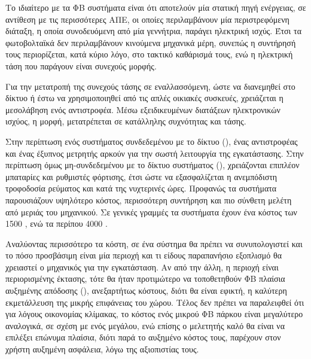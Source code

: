 \documentclass[12pt]{report}
\begin{document}
Το ιδιαίτερο με τα ΦΒ συστήματα είναι ότι αποτελούν μία στατική πηγή ενέργειας, σε αντίθεση με τις περισσότερες ΑΠΕ, οι οποίες περιλαμβάνουν μία περιστρεφόμενη διάταξη, η οποία συνοδευόμενη από μία γεννήτρια, παράγει ηλεκτρική
ισχύς. Έτσι τα φωτοβολταϊκά δεν περιλαμβάνουν κινούμενα μηχανικά μέρη, συνεπώς η συντήρησή τους περιορίζεται, κατά κύριο λόγο, στο τακτικό καθάρισμά τους, ενώ η ηλεκτρική τάση που παράγουν είναι συνεχούς μορφής.

Για την μετατροπή της συνεχούς τάσης σε εναλλασσόμενη, ώστε να διανεμηθεί στο δίκτυο ή έστω να χρησιμοποιηθεί από τις απλές οικιακές συσκευές, χρειάζεται η μεσολάβηση ενός αντιστροφέα. Μέσω εξειδικευμένων διατάξεων ηλεκτρονικών
ισχύος, η {} μορφή, μετατρέπεται σε {} κατάλληλης συχνότητας και τάσης. 

Στην περίπτωση ενός συστήματος συνδεδεμένου με το δίκτυο ({}), ένας αντιστροφέας και ένας έξυπνος μετρητής αρκούν για την σωστή λειτουργία της εγκατάστασης. Στην περίπτωση όμως μη-συνδεδεμένου με το δίκτυο
συστήματος ({}), χρειάζονται επιπλέον μπαταρίες και ρυθμιστές φόρτισης, έτσι ώστε να εξασφαλίζεται η ανεμπόδιστη τροφοδοσία ρεύματος και κατά της νυχτερινές ώρες. Προφανώς τα {}
συστήματα παρουσιάζουν υψηλότερο κόστος, περισσότερη συντήρηση και πιο σύνθετη μελέτη από μεριάς του μηχανικού. Σε γενικές γραμμές τα {} συστήματα έχουν ένα κόστος των 1500 {}, ενώ τα 
{} περίπου 4000 {}.

Αναλύοντας περισσότερο τα κόστη, σε ένα σύστημα θα πρέπει να συνυπολογιστεί και το πόσο προσβάσιμη είναι μία περιοχή και τι είδους παραπανήσιο εξοπλισμό θα χρειαστεί ο μηχανικός για την εγκατάσταση. 
Αν από την άλλη, η περιοχή είναι περιορισμένης έκτασης, τότε θα ήταν προτιμώτερο να τοποθετηθούν ΦΒ πλαίσια αυξημένης απόδοσης ({}), ανεξαρτήτως κόστους, διότι θα είναι εφικτή, η καλύτερη εκμετάλλευση 
της μικρής επιφάνειας του χώρου. Τέλος δεν
πρέπει να παραλειφθεί ότι για λόγους οικονομίας κλίμακας, το κόστος ενός μικρού ΦΒ πάρκου είναι μεγαλύτερο αναλογικά, σε σχέση με ενός μεγάλου, ενώ επίσης ο μελετητής καλό θα είναι να επιλέξει επώνυμα πλαίσια, 
διότι παρά το αυξημένο κόστος τους, παρέχουν στον χρήστη αυξημένη ασφάλεια, λόγω της αξιοπιστίας τους. 
\end{document}
